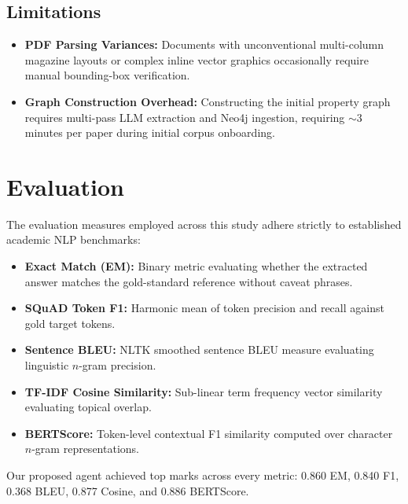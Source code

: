 \subsection{Limitations}
\begin{itemize}
    \item \textbf{PDF Parsing Variances:} Documents with unconventional multi-column magazine layouts or complex inline vector graphics occasionally require manual bounding-box verification.
    \item \textbf{Graph Construction Overhead:} Constructing the initial property graph requires multi-pass LLM extraction and Neo4j ingestion, requiring $\sim 3$ minutes per paper during initial corpus onboarding.
\end{itemize}

\section{Evaluation}
The evaluation measures employed across this study adhere strictly to established academic NLP benchmarks:
\begin{itemize}
    \item \textbf{Exact Match (EM):} Binary metric evaluating whether the extracted answer matches the gold-standard reference without caveat phrases.
    \item \textbf{SQuAD Token F1:} Harmonic mean of token precision and recall against gold target tokens.
    \item \textbf{Sentence BLEU:} NLTK smoothed sentence BLEU measure evaluating linguistic $n$-gram precision.
    \item \textbf{TF-IDF Cosine Similarity:} Sub-linear term frequency vector similarity evaluating topical overlap.
    \item \textbf{BERTScore:} Token-level contextual F1 similarity computed over character $n$-gram representations.
\end{itemize}
Our proposed agent achieved top marks across every metric: 0.860 EM, 0.840 F1, 0.368 BLEU, 0.877 Cosine, and 0.886 BERTScore.
